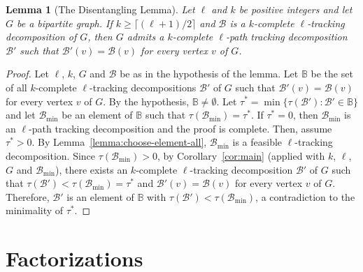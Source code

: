 \documentclass[12pt,reqno,a4paper]{amsart}
\newtheorem{lemma}[theorem]{Lemma}
\newcommand{\B}{\mathcal{B}}
\begin{document}
\begin{lemma}[The Disentangling Lemma]\label{lemma:disentangling}
	Let \(\ell\) and $k$ be positive integers and let \(G\) be a bipartite graph.
	If $k\geq \lceil (\ell +1)/2\rceil$ and $\B$ is a $k$-complete 
	\(\ell\)-tracking decomposition of $G$,
	then \(G\) admits a $k$-complete
	\(\ell\)-path tracking decomposition \(\B'\)
	such that \(\B'(v) = \B(v)\) for every vertex \(v\) of \(G\).
\end{lemma}



\begin{proof}
Let \(\ell\), \(k\), \(G\) and  $\B$ be as in the hypothesis of the lemma. 
%
Let \(\mathbb{B}\) be the set of all \(k\)-complete 
\(\ell\)-tracking decompositions \(\B'\) of \(G\)
such that \(\B'(v) = \B(v)\) for every vertex \(v\) of \(G\).
By the hypothesis, \(\mathbb{B} \neq \emptyset\).
Let \(\tau^* = \min\{\tau(\B') \colon \B' \in \mathbb{B}\}\) 
and let \(\B_{\min}\) be an element of \(\mathbb{B}\) such that \(\tau(\B_{\min}) = \tau^*\).
If \(\tau^* = 0\), then \(\B_{\min}\) is an \(\ell\)-path tracking decomposition 
and the proof is complete. 
Then, assume \(\tau^*>0\).
%
By Lemma~\ref{lemma:choose-element-all},
\(\B_{\min}\) is a feasible \(\ell\)-tracking decomposition.
Since \(\tau(\B_{\min})>0\), by Corollary~\ref{cor:main}
(applied with \(k\), $\ell$, $G$ and $\B_{\min}$), 
there exists an $k$-complete \(\ell\)-tracking decomposition $\B'$ 
of $G$ such that \(\tau(\B') < \tau(\B_{\min}) = \tau^*\) and \(\B'(v) = \B(v)\) for every 
vertex \(v\) of \(G\). 
Therefore, $\B'$ is an element of $\mathbb{B}$ with $\tau(\B') < \tau(\B_{\min})$, 
a contradiction to the minimality of \(\tau^*\).
\end{proof}

\section{Factorizations}\label{section:factorizations}
\end{document}
